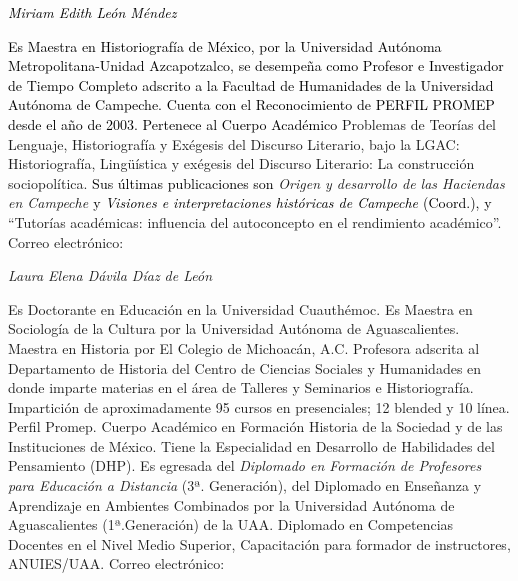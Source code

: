 \bigskip

{ 
\textit{\textcolor{black}{Miriam Edith León Méndez }}\textcolor{black}{ }}

{ 
\textcolor{black}{Es Maestra en Historiografía de México, por la Universidad
Autónoma Metropolitana-Unidad Azcapotzalco,  se desempeña como Profesor e
Investigador de Tiempo Completo adscrito a la Facultad de Humanidades de la
Universidad Autónoma de Campeche. Cuenta con el Reconocimiento de PERFIL
PROMEP desde el año de 2003. Pertenece al Cuerpo Académico }Problemas de
Teorías del Lenguaje, Historiografía  y Exégesis del Discurso Literario,
bajo la\textbf{ }LGAC: Historiografía, Lingüística y exégesis del Discurso
Literario: La construcción sociopolítica. \textcolor{black}{Sus últimas
publicaciones son}\textcolor{black}{ }\textit{Origen y desarrollo de las
Haciendas en Campeche}\textit{\textcolor{black}{ }}\textcolor{black}{y
}\textit{\textcolor{black}{Visiones e interpretaciones históricas de
Campeche }}\textcolor{black}{(Coord.), y }“Tutorías académicas: influencia
del autoconcepto en el rendimiento académico”.  Correo electrónico:
\href{mailto:leonmiry@yahoo.com.mx}{}}


\bigskip

{ 
\textit{Laura Elena Dávila Díaz de León}}

{ 
Es Doctorante en Educación en la Universidad Cuauthémoc. Es Maestra en
Sociología de la Cultura por la Universidad Autónoma de Aguascalientes.
Maestra en Historia por El Colegio de Michoacán, A.C. Profesora adscrita al
Departamento de Historia del Centro de Ciencias Sociales y Humanidades en
donde imparte materias en el área de Talleres y Seminarios e
Historiografía.  Impartición de aproximadamente 95 cursos en presenciales;
12 blended y 10 línea. Perfil Promep. Cuerpo Académico en Formación
Historia de la Sociedad y de las Instituciones de México. Tiene la
Especialidad en Desarrollo de Habilidades del Pensamiento (DHP). Es
egresada del \textit{Diplomado en Formación de Profesores para Educación a
Distancia }(3ª. Generación), del Diplomado en Enseñanza y Aprendizaje
en\textit{ }Ambientes Combinados por la Universidad Autónoma de
Aguascalientes (1ª.Generación) de la UAA. Diplomado en Competencias
Docentes\textit{ }en el Nivel Medio Superior, Capacitación para formador de
instructores, ANUIES/UAA. Correo electrónico:
\href{mailto:ledavila@correo.uaa.mx}{\textstyleInternetlink{\textcolor{blue}{ledavila@correo.uaa.mx}}}}


\bigskip


